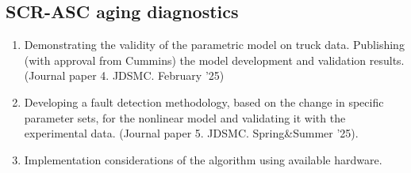 \subsection{SCR-ASC aging diagnostics}
\begin{enumerate}
        \item Demonstrating the validity of the parametric model on truck data. Publishing (with approval from Cummins) the model development and validation results. (Journal paper 4. JDSMC. February '25)
        \item Developing a fault detection methodology, based on the change in specific parameter sets, for the nonlinear model and validating it with the experimental data. (Journal paper 5. JDSMC. Spring&Summer '25).
        \item Implementation considerations of the algorithm using available hardware.
\end{enumerate}
